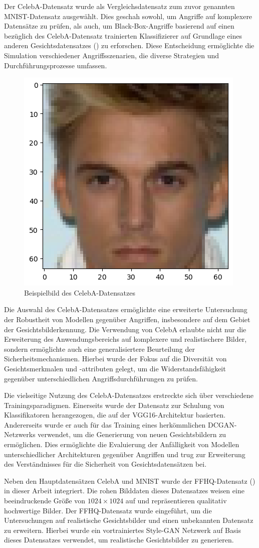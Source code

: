Der CelebA-Datensatz wurde als Vergleichsdatensatz zum zuvor genannten MNIST-Datensatz ausgewählt. Dies geschah sowohl, um Angriffe auf komplexere Datensätze zu prüfen, als auch, um Black-Box-Angriffe basierend auf einen bezüglich des CelebA-Datensatz trainierten Klassifizierer auf Grundlage eines anderen Gesichtsdatensatzes (\cite{noauthor_nvlabsffhq-dataset_2023}) zu erforschen. Diese Entscheidung ermöglichte die Simulation verschiedener Angriffsszenarien, die diverse Strategien und Durchführungsprozesse umfassen.

\begin{figure}[H]
	\centering
	\includegraphics[width=0.2\linewidth]{Bilder/0_celeba_one.png}
	\caption{Beispielbild des CelebA-Datensatzes}
	\label{img:celeba}
\end{figure}

Die Auswahl des CelebA-Datensatzes ermöglichte eine erweiterte Untersuchung der Robustheit von Modellen gegenüber Angriffen, insbesondere auf dem Gebiet der Gesichtsbilderkennung. Die Verwendung von CelebA erlaubte nicht nur die Erweiterung des Anwendungsbereichs auf komplexere und realistischere Bilder, sondern ermöglichte auch eine generalisiertere Beurteilung der Sicherheitsmechanismen. Hierbei wurde der Fokus auf die Diversität von Gesichtsmerkmalen und -attributen gelegt, um die Widerstandsfähigkeit gegenüber unterschiedlichen Angriffsdurchführungen zu prüfen.

Die vielseitige Nutzung des CelebA-Datensatzes erstreckte sich über verschiedene Trainingsparadigmen. Einerseits wurde der Datensatz zur Schulung von Klassifikatoren herangezogen, die auf der VGG16-Architektur basierten. Andererseits wurde er auch für das Training eines herkömmlichen DCGAN-Netzwerks verwendet, um die Generierung von \glqq neuen\grqq{} Gesichtsbildern zu ermöglichen. Dies ermöglichte die Evaluierung der Anfälligkeit von Modellen unterschiedlicher Architekturen gegenüber Angriffen und trug zur Erweiterung des Verständnisses für die Sicherheit von Gesichtsdatensätzen bei.

Neben den Hauptdatensätzen CelebA und MNIST wurde der FFHQ-Datensatz (\cite{noauthor_nvlabsffhq-dataset_2023}) in dieser Arbeit integriert. Die \glqq rohen\grqq{} Bilddaten dieses Datensatzes weisen eine beeindruckende Größe von $1024 \times 1024$ auf und repräsentieren qualitativ hochwertige Bilder. Der FFHQ-Datensatz wurde eingeführt, um die Untersuchungen auf realistische Gesichtsbilder und einen unbekannten Datensatz zu erweitern. Hierbei wurde ein vortrainiertes Style-GAN Netzwerk auf Basis dieses Datensatzes verwendet, um realistische Gesichtsbilder zu generieren.

